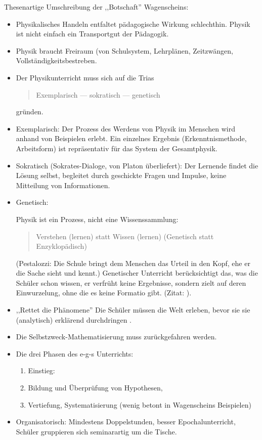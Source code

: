 \bip
Thesenartige Umschreibung der ,,Botschaft'' Wagenscheins:
\begin{itemize}

\item Physikalisches Handeln entfaltet p\"{a}dagogische  Wirkung
schlechthin. Physik ist nicht einfach ein Transportgut der P\"{a}dagogik.

\item Physik braucht Freiraum (von Schulsystem, Lehrpl\"{a}nen,
Zeitzw\"{a}ngen, Vollst\"{a}ndigkeitsbestreben.
\item Der Physikunterricht muss sich auf die Trias
\begin{quote}
Exemplarisch --- sokratisch --- genetisch
\end{quote}
gr\"{u}nden.


\item Exemplarisch: Der Prozess des Werdens von Physik im Menschen
wird anhand von Beispielen erlebt.
Ein einzelnes Ergebnis (Erkenntnismethode,
Arbeitsform) ist repr\"{a}sentativ f\"{u}r das System der Gesamtphysik.
\item Sokratisch  (Sokrates-Dialoge, von Platon \"{u}berliefert):
Der Lernende findet die L\"{o}sung selbst, begleitet durch geschickte
Fragen und Impulse, keine Mitteilung von Informationen.


\item Genetisch:

Physik ist ein Prozess, nicht eine Wissenssammlung:
\begin{quote}
Verstehen (lernen) statt Wissen (lernen)  (Genetisch statt
Enzyklop\"{a}disch)
\end{quote}
(Pestalozzi: Die Schule bringt dem Menschen das Urteil in den Kopf,
ehe er die Sache sieht und kennt.)
\mip
Genetischer Unterricht ber\"{u}cksichtigt das, was die
Sch\"{u}ler schon wissen, er verfr\"{u}ht keine Ergebnisse, sondern zielt
auf deren Einwurzelung, ohne die es keine Formatio gibt.
(Zitat: \cite[S.\ 107 oben]{DuitHausslerKircher}).

\item ,,Rettet die Ph\"{a}nomene'' Die Sch\"{u}ler m\"{u}ssen die Welt
erleben, bevor sie sie (analytisch) erkl\"{a}rend durchdringen
\autocite[S.\ 90,104]{WagenscheinNSV}.

\item Die Selbstzweck-Mathematisierung muss zur\"{u}ckgefahren werden.

\item Die drei Phasen des e-g-s Unterrichts:
\begin{enumerate}
\item Einstieg: 
\autocite[S.\ 205]{WagenscheinPDP}
\item Bildung und \"{U}berpr\"{u}fung von Hypothesen,
\item Vertiefung, Systematisierung (wenig betont in Wagenscheins
Beispielen)
\end{enumerate}

\item Organisatorisch: Mindestens Doppelstunden, besser
Epochalunterricht, Sch\"{u}ler gruppieren sich seminarartig um die
Tische.
\end{itemize}

